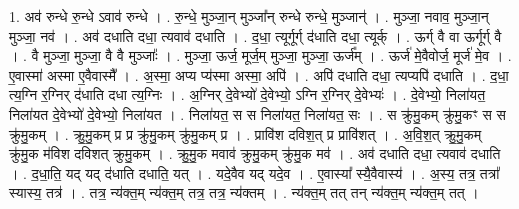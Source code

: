 \documentclass[17pt]{extarticle}
\begin{document}
1. अव॑ रुन्धे रु॒न्धे ऽवाव॑ रुन्धे । . रु॒न्धे॒ मुञ्जा॒न् मुञ्जा᳚न् रुन्धे रुन्धे॒ मुञ्जान्॑ । . मुञ्जा॒ नवाव॒ मुञ्जा॒न् मुञ्जा॒ नव॑ । . अव॑ दधाति दधा॒ त्यवाव॑ दधाति । . द॒धा॒ त्यूर्गूर्ग् द॑धाति दधा॒ त्यूर्क् । . ऊर्ग् वै वा ऊर्गूर्ग् वै । . वै मुञ्जा॒ मुञ्जा॒ वै वै मुञ्जाः᳚ । . मुञ्जा॒ ऊर्ज॒ मूर्ज॒म् मुञ्जा॒ मुञ्जा॒ ऊर्ज᳚म् । . ऊर्ज॑ मे॒वैवोर्ज॒ मूर्ज॑ मे॒व । . ए॒वास्मा॑ अस्मा ए॒वैवास्मै᳚ । . अ॒स्मा॒ अप्य प्य॑स्मा अस्मा॒ अपि॑ । . अपि॑ दधाति दधा॒ त्यप्यपि॑ दधाति । . द॒धा॒ त्य॒ग्नि र॒ग्निर् द॑धाति दधा त्य॒ग्निः । . अ॒ग्निर् दे॒वेभ्यो॑ दे॒वेभ्यो॒ ऽग्नि र॒ग्निर् दे॒वेभ्यः॑ । . दे॒वेभ्यो॒ निला॑यत॒ निला॑यत दे॒वेभ्यो॑ दे॒वेभ्यो॒ निला॑यत । . निला॑यत॒ स स निला॑यत॒ निला॑यत॒ सः । . स क्रु॑मु॒कम् क्रु॑मु॒कꣳ स स क्रु॑मु॒कम् । . क्रु॒मु॒कम् प्र प्र क्रु॑मु॒कम् क्रु॑मु॒कम् प्र । . प्रावि॑श दविश॒त् प्र प्रावि॑शत् । . अ॒वि॒श॒त् क्रु॒मु॒कम् क्रु॑मु॒क म॑विश दविशत् क्रुमु॒कम् । . क्रु॒मु॒क मवाव॑ क्रुमु॒कम् क्रु॑मु॒क मव॑ । . अव॑ दधाति दधा॒ त्यवाव॑ दधाति । . द॒धा॒ति॒ यद् यद् द॑धाति दधाति॒ यत् । . यदे॒वैव यद् यदे॒व । . ए॒वास्या᳚ स्यै॒वैवास्य॑ । . अ॒स्य॒ तत्र॒ तत्रा᳚ स्यास्य॒ तत्र॑ । . तत्र॒ न्य॑क्त॒म् न्य॑क्त॒म् तत्र॒ तत्र॒ न्य॑क्तम् । . न्य॑क्त॒म् तत् तन् न्य॑क्त॒म् न्य॑क्त॒म् तत् । \newline
\end{document}

